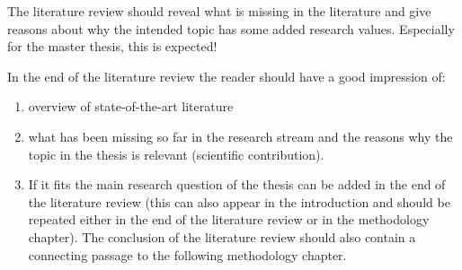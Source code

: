 The literature review should reveal what is missing in the literature and give reasons about why the intended topic has some added research values. Especially for the master thesis, this is expected! 

In the end of the literature review the reader should have a good impression of: 

\begin{enumerate}
    \item overview of state-of-the-art literature
    \item what has been missing so far in the research stream and the reasons why the topic in the thesis is relevant (scientific contribution). 
    \item If it fits the main research question of the thesis can be added in the end of the literature review (this can also appear in the introduction and should be repeated either in the end of the literature review or in the methodology chapter). The conclusion of the literature review should also contain a connecting passage to the following methodology chapter. 
\end{enumerate}